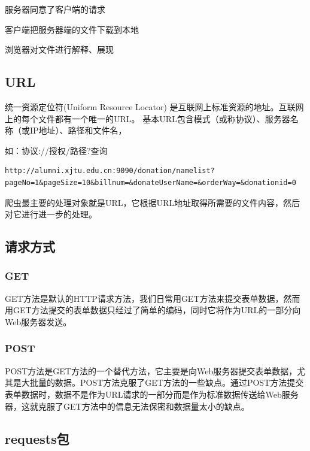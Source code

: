 \documentclass[]{ctexbook}
\begin{document}
服务器同意了客户端的请求

客户端把服务器端的文件下载到本地

浏览器对文件进行解释、展现

\hypertarget{url}{%
\subsection{URL}\label{url}}

统一资源定位符(Uniform Resource Locator) 是互联网上标准资源的地址。互联网上的每个文件都有一个唯一的URL。
基本URL包含模式（或称协议）、服务器名称（或IP地址）、路径和文件名，

如：协议://授权/路径?查询

\begin{verbatim}
http://alumni.xjtu.edu.cn:9090/donation/namelist?pageNo=1&pageSize=10&billnum=&donateUserName=&orderWay=&donationid=0
\end{verbatim}

爬虫最主要的处理对象就是URL，它根据URL地址取得所需要的文件内容，然后对它进行进一步的处理。

\hypertarget{ux8bf7ux6c42ux65b9ux5f0f}{%
\subsection{请求方式}\label{ux8bf7ux6c42ux65b9ux5f0f}}

\hypertarget{get}{%
\subsubsection{GET}\label{get}}

GET方法是默认的HTTP请求方法，我们日常用GET方法来提交表单数据，然而用GET方法提交的表单数据只经过了简单的编码，同时它将作为URL的一部分向Web服务器发送。

\hypertarget{post}{%
\subsubsection{POST}\label{post}}

POST方法是GET方法的一个替代方法，它主要是向Web服务器提交表单数据，尤其是大批量的数据。POST方法克服了GET方法的一些缺点。通过POST方法提交表单数据时，数据不是作为URL请求的一部分而是作为标准数据传送给Web服务器，这就克服了GET方法中的信息无法保密和数据量太小的缺点。

\hypertarget{requestsux5305}{%
\subsection{requests包}\label{requestsux5305}}
\end{document}
